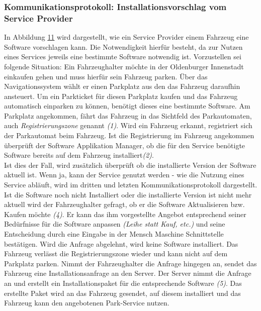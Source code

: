 \subsubsection{Kommunikationsprotokoll: Installationsvorschlag vom Service Provider}
In Abbildung \hyperref[img:installationsProtokollExtern]{11} wird dargestellt, wie ein Service Provider einem Fahrzeug eine Software vorschlagen kann. Die Notwendigkeit hierfür besteht, da zur Nutzen eines Services jeweils eine bestimmte Software notwendig ist. Vorzustellen sei folgende Situation: Ein Fahrzeughalter möchte in der Oldenburger Innenstadt einkaufen gehen und muss hierfür sein Fahrzeug parken. Über das Navigationssystem wählt er einen Parkplatz aus den das Fahrzeug daraufhin ansteuert. Um ein Parkticket für diesen Parkplatz kaufen und das Fahrzeug automatisch einparken zu können, benötigt dieses eine bestimmte Software. Am Parkplatz angekommen, fährt das Fahrzeug in das Sichtfeld des Parkautomaten, auch \textit{Registrierungszone} genannt \textit{(1)}. Wird ein Fahrzeug erkannt, registriert sich der Parkautomat beim Fahrzeug. Ist die Registrierung im Fahrzeug angekommen überprüft der Software Applikation Manager, ob die für den Service benötigte Software bereits auf dem Fahrzeug installiert\textit{(2)}.\\
Ist dies der Fall, wird zusätzlich überprüft ob die installierte Version der Software aktuell ist. Wenn ja, kann der Service genutzt werden - wie die Nutzung eines Service abläuft, wird im dritten und letzten Kommunikationsprotokoll dargestellt. Ist die Software noch nicht Installiert oder die installierte Version ist nicht mehr aktuell wird der Fahrzeughalter gefragt, ob er die Software Aktualisieren bzw. Kaufen möchte \textit{(4)}. Er kann das ihm vorgestellte Angebot entsprechend seiner Bedürfnisse für die Software anpassen \textit{(Leihe statt Kauf, etc.)} und seine Entscheidung durch eine Eingabe in der Mensch Maschine Schnittstelle bestätigen. Wird die Anfrage abgelehnt, wird keine Software installiert. Das Fahrzeug verlässt die Registrierungszone wieder und kann nicht auf dem Parkplatz parken. Nimmt der Fahrzeughalter die Anfrage hingegen an, sendet das Fahrzeug eine Installationsanfrage an den Server.  Der Server nimmt die Anfrage an und erstellt ein Installationspaket für die entsprechende Software \textit{(5)}. Das erstellte Paket wird an das Fahrzeug gesendet, auf diesem installiert und das Fahrzeug kann den angebotenen Park-Service nutzen. 
